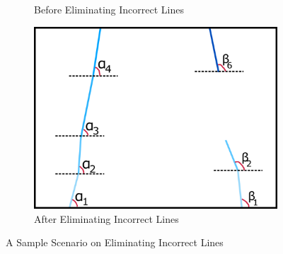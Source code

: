 \documentclass[a4paper,12pt]{article}
\begin{document}
\begin{enumerate}[A.]
\begin{figure}[t!]
\begin{subfigure}{.46\textwidth}
\caption{\label{fig:dataP_explained1} Before Eliminating Incorrect Lines}

\end{subfigure}%
\begin{subfigure}{.46\textwidth}

\centering

\includegraphics[width=0.44\unitlength]{images/dataP_explained2}

\caption{\label{fig:dataP_explained2} After Eliminating Incorrect Lines}

\end{subfigure}

\caption{\label{fig:dataP_explained} A Sample Scenario on Eliminating Incorrect Lines}

\end{figure}






\end{enumerate}
\end{document}
